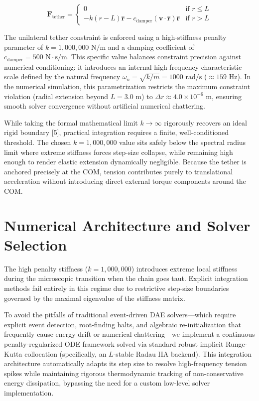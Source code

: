 \documentclass[11pt,aip,reprint,superscriptaddress]{revtex4-2}
\begin{document}
\begin{equation}
\mathbf{F}_{\text{tether}} = \begin{cases} 0 & \text{if } r \le L \\ -k(r - L)\hat{\mathbf{r}} - c_{\text{damper}}(\mathbf{v} \cdot \hat{\mathbf{r}})\hat{\mathbf{r}} & \text{if } r > L \end{cases}
\end{equation}

The unilateral tether constraint is enforced using a high-stiffness penalty parameter of $k = 1,000,000\text{ N/m}$ and a damping coefficient of $c_{\text{damper}} = 500\text{ N}\cdot\text{s/m}$. This specific value balances constraint precision against numerical conditioning: it introduces an internal high-frequency characteristic scale defined by the natural frequency $\omega_n = \sqrt{k/m} = 1000\text{ rad/s}$ ($\approx 159\text{ Hz}$). In the numerical simulation, this parametrization restricts the maximum constraint violation (radial extension beyond $L = 3.0\text{ m}$) to $\Delta r \approx 4.0 \times 10^{-6}\text{ m}$, ensuring smooth solver convergence without artificial numerical chattering.

While taking the formal mathematical limit $k \to \infty$ rigorously recovers an ideal rigid boundary [5], practical integration requires a finite, well-conditioned threshold. The chosen $k = 1,000,000$ value sits safely below the spectral radius limit where extreme stiffness forces step-size collapse, while remaining high enough to render elastic extension dynamically negligible. Because the tether is anchored precisely at the COM, tension contributes purely to translational acceleration without introducing direct external torque components around the COM.

\section{Numerical Architecture and Solver Selection}

The high penalty stiffness (\(k = 1,000,000\)) introduces extreme local stiffness during the microscopic transition when the chain goes taut. Explicit integration methods fail entirely in this regime due to restrictive step-size boundaries governed by the maximal eigenvalue of the stiffness matrix.

To avoid the pitfalls of traditional event-driven DAE solvers—which require explicit event detection, root-finding halts, and algebraic re-initialization that frequently cause energy drift or numerical chattering—we implement a continuous penalty-regularized ODE framework solved via standard robust implicit Runge-Kutta collocation (specifically, an $L$-stable Radau IIA backend). This integration architecture automatically adapts its step size to resolve high-frequency tension spikes while maintaining rigorous thermodynamic tracking of non-conservative energy dissipation, bypassing the need for a custom low-level solver implementation.
\end{document}
